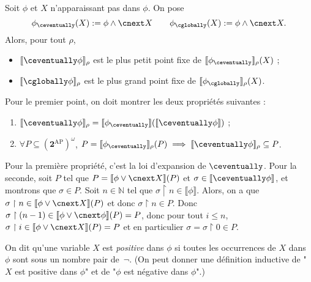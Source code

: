\documentclass[./main]{subfiles}
\begin{document}
  \begin{lem}
    Soit $\phi$ et $X$ n'apparaissant pas dans $\phi$.
    On pose
    \[
      \phi_{\eventually} (X) := \phi \land \nxt X
      \quad\quad
      \phi_{\always} (X) := \phi \land \nxt X
    .\]
    Alors, pour tout $\rho$,
    \begin{itemize}
      \item $\llbracket \eventually \phi \rrbracket_\rho$ est le plus petit point fixe de $\llbracket \phi_{\eventually} \rrbracket_\rho(X)$ ;
      \item $\llbracket \always \phi \rrbracket_\rho$ est le plus grand point fixe de $\llbracket \phi_{\always} \rrbracket_\rho(X)$.
    \end{itemize}
  \end{lem}
  \begin{prv}
    Pour le premier point, on doit montrer les deux propriétés suivantes :
    \begin{enumerate}
      \item $\llbracket \eventually \phi\rrbracket_\rho = \llbracket \phi_{\eventually} \rrbracket (\llbracket \eventually \phi\rrbracket)$ ;
      \item $\forall P \subseteq (\mathbf{2}^\mathrm{AP})^\omega$, $P = \llbracket \phi_{\eventually} \rrbracket_\rho(P) \implies \llbracket \eventually \phi \rrbracket_\rho \subseteq P$.
    \end{enumerate}

    Pour la première propriété, c'est la loi d'expansion de $\eventually$.
    Pour la seconde, soit $P$ tel que $P = \llbracket \phi \lor \nxt X\rrbracket (P) $ et $\sigma \in \llbracket \eventually \phi\rrbracket$, et montrons que $\sigma \in P$.
    Soit $n \in \mathds{N}$ tel que $\sigma \upharpoonright n \in \llbracket \phi\rrbracket$.
    Alors, on a que $\sigma \upharpoonright n \in \llbracket \phi \lor \nxt X\rrbracket (P)$ et donc $\sigma \upharpoonright n \in P$.
    Donc $\sigma \upharpoonright (n-1) \in \llbracket \phi \lor \nxt \phi \rrbracket(P) = P$, donc pour tout $i \le n$,  $\sigma \upharpoonright i \in \llbracket \phi \lor \nxt X\rrbracket (P) = P $ et en particulier $\sigma = \sigma \upharpoonright 0 \in P$.
  \end{prv}

  \begin{defn}
    On dit qu'une variable $X$ est \textit{positive} dans $\phi$ si toutes les occurrences de $X$ dans $\phi$ sont sous un nombre pair de~$\lnot$.
    (On peut donner une définition inductive de "$X$ est positive dans $\phi$" et de "$\phi$ est négative dans $\phi$".)
  \end{defn}
\end{document}

